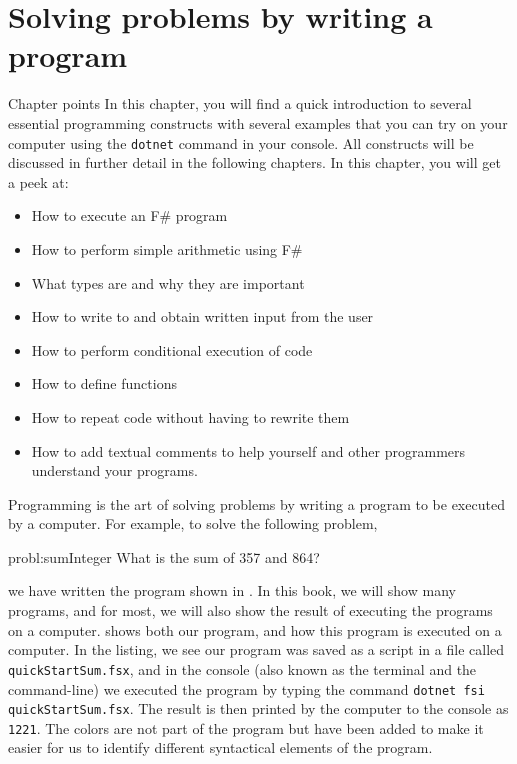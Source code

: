 \documentclass[springer.tex]{subfiles}
\begin{document}
\chapter{Solving problems by writing a program}
\begin{overview}{Chapter points}
  In this chapter, you will find a quick introduction to several essential programming constructs with several examples that you can try on your computer using the \lstinline[language=console]{dotnet} command in your console. All constructs will be discussed in further detail in the following chapters. In this chapter, you will get a peek at:
  \begin{itemize}
  \item How to execute an F\# program
  \item How to perform simple arithmetic using F\#
  \item What types are and why they are important
  \item How to write to and obtain written input from the user
  \item How to perform conditional execution of code
  \item How to define functions
  \item How to repeat code without having to rewrite them
  \item How to add textual comments to help yourself and other programmers understand your programs.
  \end{itemize}
\end{overview}

Programming is the art of solving problems by writing a program to be executed by a computer. For example, to solve the following problem,
%
\begin{task}{probl:sumInteger}
  What is the sum of 357 and 864?
\end{task}
%
we have written the program shown in .
%
%
In this book, we will show many programs, and for most, we will also show the result of executing the programs on a computer.  shows both our program, and how this program is executed on a computer. In the listing, we see our program was saved as a script in a file called \lstinline[language=console]{quickStartSum.fsx}, and in the console (also known as the terminal and the command-line) we executed the program by typing the command \lstinline[language=console]|dotnet fsi quickStartSum.fsx|. The result is then printed by the computer to the console as \lstinline{1221}. The colors are not part of the program but have been added to make it easier for us to identify different syntactical elements of the program.
\end{document}
